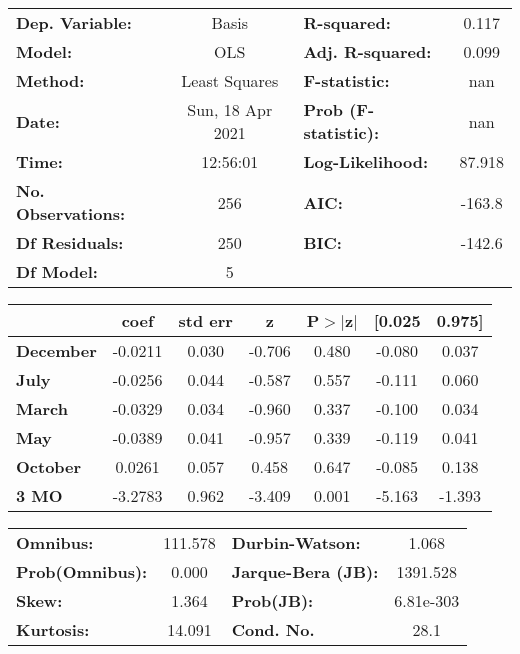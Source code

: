 \begin{center}
\begin{tabular}{lclc}
\toprule
\textbf{Dep. Variable:}    &      Basis       & \textbf{  R-squared:         } &     0.117   \\
\textbf{Model:}            &       OLS        & \textbf{  Adj. R-squared:    } &     0.099   \\
\textbf{Method:}           &  Least Squares   & \textbf{  F-statistic:       } &       nan   \\
\textbf{Date:}             & Sun, 18 Apr 2021 & \textbf{  Prob (F-statistic):} &      nan    \\
\textbf{Time:}             &     12:56:01     & \textbf{  Log-Likelihood:    } &    87.918   \\
\textbf{No. Observations:} &         256      & \textbf{  AIC:               } &    -163.8   \\
\textbf{Df Residuals:}     &         250      & \textbf{  BIC:               } &    -142.6   \\
\textbf{Df Model:}         &           5      & \textbf{                     } &             \\
\bottomrule
\end{tabular}
\begin{tabular}{lcccccc}
                  & \textbf{coef} & \textbf{std err} & \textbf{z} & \textbf{P$> |$z$|$} & \textbf{[0.025} & \textbf{0.975]}  \\
\midrule
\textbf{December} &      -0.0211  &        0.030     &    -0.706  &         0.480        &       -0.080    &        0.037     \\
\textbf{July}     &      -0.0256  &        0.044     &    -0.587  &         0.557        &       -0.111    &        0.060     \\
\textbf{March}    &      -0.0329  &        0.034     &    -0.960  &         0.337        &       -0.100    &        0.034     \\
\textbf{May}      &      -0.0389  &        0.041     &    -0.957  &         0.339        &       -0.119    &        0.041     \\
\textbf{October}  &       0.0261  &        0.057     &     0.458  &         0.647        &       -0.085    &        0.138     \\
\textbf{3 MO}     &      -3.2783  &        0.962     &    -3.409  &         0.001        &       -5.163    &       -1.393     \\
\bottomrule
\end{tabular}
\begin{tabular}{lclc}
\textbf{Omnibus:}       & 111.578 & \textbf{  Durbin-Watson:     } &     1.068  \\
\textbf{Prob(Omnibus):} &   0.000 & \textbf{  Jarque-Bera (JB):  } &  1391.528  \\
\textbf{Skew:}          &   1.364 & \textbf{  Prob(JB):          } & 6.81e-303  \\
\textbf{Kurtosis:}      &  14.091 & \textbf{  Cond. No.          } &      28.1  \\
\bottomrule
\end{tabular}
\end{center}

